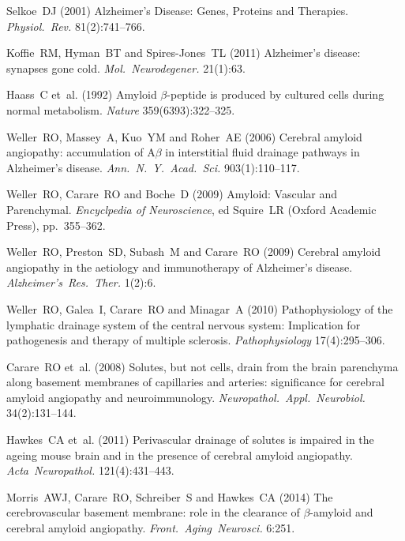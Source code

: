 \documentclass[a4paper,titlepage]{scrartcl}
\begin{document}

\begin{thebibliography}{10}
Selkoe~DJ (2001) Alzheimer's Disease: Genes, Proteins and Therapies. {\em Physiol.~Rev.} 81(2):741--766.

Koffie~RM, Hyman~BT and Spires-Jones~TL (2011) Alzheimer's disease: synapses gone cold. {\em Mol.~Neurodegener.} 21(1):63.

Haass~C et~al. (1992) Amyloid $\beta$-peptide is produced by cultured cells during normal metabolism. {\em Nature} 359(6393):322--325.

Weller~RO, Massey~A, Kuo~YM and Roher~AE (2006) Cerebral amyloid angiopathy: accumulation of A$\beta$ in interstitial fluid drainage pathways in Alzheimer's disease. {\em Ann.~N.~Y.~Acad.~Sci.} 903(1):110--117.

Weller~RO, Carare~RO and Boche~D (2009) Amyloid: Vascular and Parenchymal. {\em Encyclpedia of Neuroscience}, ed Squire~LR (Oxford Academic Press), pp.~355--362.

Weller~RO, Preston~SD, Subash~M and Carare~RO (2009) Cerebral amyloid angiopathy in the aetiology and immunotherapy of Alzheimer's disease. {\em Alzheimer's~Res.~Ther.} 1(2):6.

Weller~RO, Galea~I, Carare~RO and Minagar~A (2010) Pathophysiology of the lymphatic drainage system of the central nervous system: Implication for pathogenesis and therapy of multiple sclerosis. {\em Pathophysiology} 17(4):295--306.

Carare~RO et~al. (2008) Solutes, but not cells, drain from the brain parenchyma along basement membranes of capillaries and arteries: significance for cerebral amyloid angiopathy and neuroimmunology. {\em Neuropathol.~Appl.~Neurobiol.} 34(2):131--144.

Hawkes~CA et~al. (2011) Perivascular drainage of solutes is impaired in the ageing mouse brain and in the presence of cerebral amyloid angiopathy. {\em Acta~Neuropathol.} 121(4):431--443.

Morris~AWJ, Carare~RO, Schreiber~S and Hawkes~CA (2014) The cerebrovascular basement membrane: role in the clearance of $\beta$-amyloid and cerebral amyloid angiopathy. {\em Front.~Aging~Neurosci.} 6:251.


\end{thebibliography}
\end{document}
